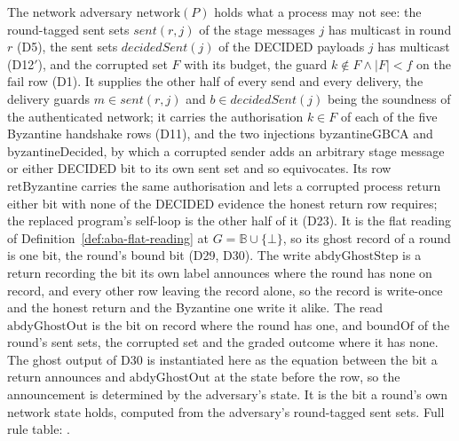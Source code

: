 \begin{definition}
  \label{def:aba-netadv}
  \leanok
  The network adversary $\mathrm{network}(P)$ holds what a process may not see: the round-tagged sent sets $sent(r,j)$ of the stage messages $j$ has multicast in round $r$ (D5), the sent sets $decidedSent(j)$ of the DECIDED payloads $j$ has multicast (D12$'$), and the corrupted set $F$ with its budget, the guard $k \notin F \wedge |F| < f$ on the $\mathrm{fail}$ row (D1).
  It supplies the other half of every send and every delivery, the delivery guards $m \in sent(r,j)$ and $b \in decidedSent(j)$ being the soundness of the authenticated network; it carries the authorisation $k \in F$ of each of the five Byzantine handshake rows (D11), and the two injections $\mathrm{byzantineGBCA}$ and $\mathrm{byzantineDecided}$, by which a corrupted sender adds an arbitrary stage message or either DECIDED bit to its own sent set and so equivocates.
  Its row $\mathrm{retByzantine}$ carries the same authorisation and lets a corrupted process return either bit with none of the DECIDED evidence the honest return row requires; the replaced program's self-loop is the other half of it (D23).
  It is the flat reading of Definition~\ref{def:aba-flat-reading} at $G = \mathbb{B} \cup \{\bot\}$, so its ghost record of a round is one bit, the round's bound bit (D29, D30).
  The write $\mathrm{abdyGhostStep}$ is a return recording the bit its own label announces where the round has none on record, and every other row leaving the record alone, so the record is write-once and the honest return and the Byzantine one write it alike.
  The read $\mathrm{abdyGhostOut}$ is the bit on record where the round has one, and $\mathrm{boundOf}$ of the round's sent sets, the corrupted set and the graded outcome where it has none.
  The ghost output of D30 is instantiated here as the equation between the bit a return announces and $\mathrm{abdyGhostOut}$ at the state before the row, so the announcement is determined by the adversary's state.
  It is the bit a round's own network state holds, computed from the adversary's round-tagged sent sets.
  Full rule table: .
\end{definition}
